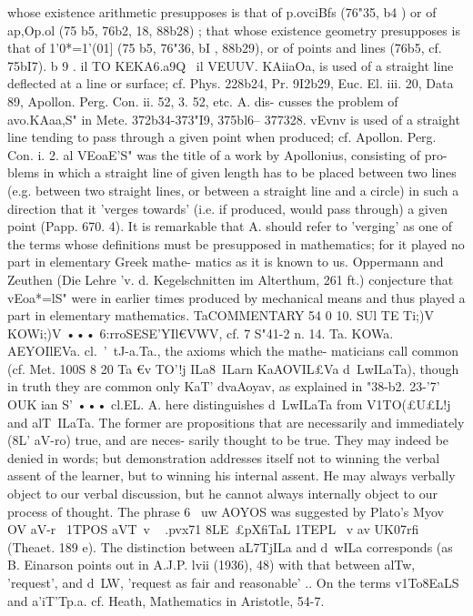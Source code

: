 {{{{{{{{{{{{{{{whose existence arithmetic presupposes is that of p.ovciBfs
(76"35, b4 ) or of ap,Op.ol (75 b5, 76b2, 18, 88b28) ; that whose existence
geometry presupposes is that of 1'0*=1'(01] (75 b5, 76"36, bI , 88b29),
or of points and lines (76b5, cf. 75bI7).
b 9 . il TO KEKA6.a9Q~ il VEUUV. KAiiaOa, is used of a straight line
deflected at a line or surface; cf. Phys. 228b24, Pr. 9I2b29, Euc.
El. iii. 20, Data 89, Apollon. Perg. Con. ii. 52, 3. 52, etc. A. dis-
cusses the problem of avo.KAaa,S" in Mete. 372b34-373"I9, 375bl6--
377328. vEvnv is used of a straight line tending to pass through
a given point when produced; cf. Apollon. Perg. Con. i. 2. al
VEoaE'S" was the title of a work by Apollonius, consisting of pro-
blems in which a straight line of given length has to be placed
between two lines (e.g. between two straight lines, or between
a straight line and a circle) in such a direction that it 'verges
towards' (i.e. if produced, would pass through) a given point
(Papp. 670. 4). It is remarkable that A. should refer to 'verging'
as one of the terms whose definitions must be presupposed in
mathematics; for it played no part in elementary Greek mathe-
matics as it is known to us. Oppermann and Zeuthen (Die Lehre
'v. d. Kegelschnitten im Alterthum, 261 ft.) conjecture that vEoa*=lS"
were in earlier times produced by mechanical means and thus
played a part in elementary mathematics.
TaCOMMENTARY
54 0
10. SUl TE Ti;)V KOWi;)V ••• 6:rroSESE'YIl€VWV, cf. 7 S"41-2 n.
14. Ta. KOWa. AEYOIlEVa. cl.~'~tJ-a.Ta., the axioms which the mathe-
maticians call common (cf. Met. 100S 8 20 Ta €v TO'!j ILa8~ILarn
KaAOVIL£Va d~LwILaTa), though in truth they are common only
KaT' dvaAoy{av, as explained in "38-b2.
23-'7' OUK ian S' ••• cl.EL. A. here distinguishes d~LwILaTa
from V1TO(}£U£L!j and alT~ILaTa. The former are propositions that
are necessarily and immediately (8L' aV-ro) true, and are neces-
sarily thought to be true. They may indeed be denied in words;
but demonstration addresses itself not to winning the verbal
assent of the learner, but to winning his internal assent. He may
always verbally object to our verbal discussion, but he cannot
always internally object to our process of thought.
The phrase 6 ~uw AOYOS was suggested by Plato's Myov OV aV-r~
1TPOS aVT~v ~ .pvx71 8LE~£pXfiTaL 1TEPL ~v av UK07rfi (Theaet. 189 e).
The distinction between aL7TjILa and d~{wILa corresponds (as
B. Einarson points out in A.J.P. lvii (1936), 48) with that between
alTw, 'request', and d~LW, 'request as fair and reasonable' ..
On the terms v1To8EaLS and a'iT'T}p.a. cf. Heath, Mathematics in
Aristotle, 54-7.
}}}}}}}}}}}}}}}

